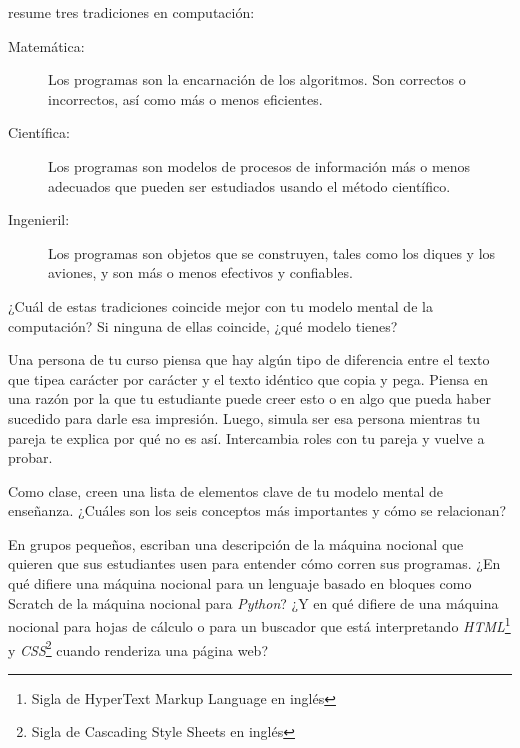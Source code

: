 
\cite{Tedr2008} resume tres tradiciones en computación:

\begin{description}

\item[Matemática:]
  Los programas son la encarnación de los algoritmos. 
Son correctos o incorrectos, así como más o menos eficientes. 

\item[Científica:]
Los programas son modelos de procesos de información más o menos adecuados
que pueden ser estudiados usando el método científico.

\item[Ingenieril:]
Los programas son objetos que se construyen, tales como los diques y los aviones,
y son más o menos efectivos y confiables.

\end{description}
¿Cuál de estas tradiciones coincide mejor con tu modelo mental de la computación?
Si ninguna de ellas coincide, ¿qué modelo tienes?

Una persona de tu curso piensa que hay algún tipo de diferencia entre el texto
que tipea carácter por carácter y el texto idéntico que copia y pega.
Piensa en una razón por la que tu estudiante puede creer esto
o en algo que pueda haber sucedido para darle esa impresión.
Luego, simula ser esa persona mientras tu pareja te explica por qué no es así.
Intercambia roles con tu pareja y vuelve a probar.


Como clase,
creen una lista de elementos clave de tu modelo mental de enseñanza.
¿Cuáles son los seis conceptos más importantes y cómo se relacionan?


En grupos pequeños,
escriban una descripción de la máquina nocional que quieren que sus estudiantes usen para entender cómo corren sus programas.
¿En qué difiere una máquina nocional para un lenguaje basado en bloques como Scratch de la máquina nocional para \emph{Python}?
¿Y en qué difiere de una máquina nocional para hojas de cálculo o para un buscador que está interpretando \emph{HTML}\footnote{Sigla de HyperText Markup Language en inglés} y \emph{CSS}\footnote{Sigla de Cascading Style Sheets en inglés} cuando renderiza una página web?

